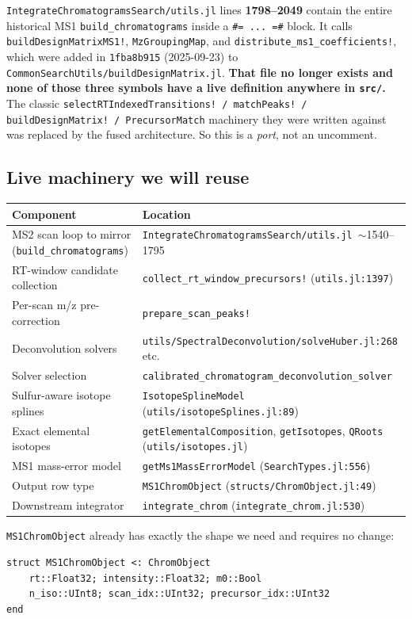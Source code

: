 \documentclass[11pt]{article}
\newcommand{\code}[1]{\texttt{\small #1}}
\newcommand{\file}[1]{\textcolor{blue!50!black}{\texttt{\small #1}}}
\begin{document}
\file{IntegrateChromatogramsSearch/utils.jl} lines \textbf{1798--2049} contain the entire
historical MS1 \code{build\_chromatograms} inside a \code{\#= ... =\#} block. It calls
\code{buildDesignMatrixMS1!}, \code{MzGroupingMap}, and \code{distribute\_ms1\_coefficients!},
which were added in \code{1fba8b915} (2025-09-23) to
\code{CommonSearchUtils/buildDesignMatrix.jl}. \textbf{That file no longer exists and none of
those three symbols have a live definition anywhere in \code{src/}.} The classic
\code{selectRTIndexedTransitions!\,/\,matchPeaks!\,/\,buildDesignMatrix!\,/\,PrecursorMatch}
machinery they were written against was replaced by the fused architecture. So this is a
\emph{port}, not an uncomment.

\subsection{Live machinery we will reuse}

\begin{tabular}{@{}ll@{}}
\toprule
\textbf{Component} & \textbf{Location} \\
\midrule
MS2 scan loop to mirror (\code{build\_chromatograms}) & \file{IntegrateChromatogramsSearch/utils.jl}~$\sim$1540--1795 \\
RT-window candidate collection & \code{collect\_rt\_window\_precursors!} (\file{utils.jl:1397}) \\
Per-scan m/z pre-correction & \code{prepare\_scan\_peaks!} \\
Deconvolution solvers & \file{utils/SpectralDeconvolution/solveHuber.jl:268} etc. \\
Solver selection & \code{calibrated\_chromatogram\_deconvolution\_solver} \\
Sulfur-aware isotope splines & \code{IsotopeSplineModel} (\file{utils/isotopeSplines.jl:89}) \\
Exact elemental isotopes & \code{getElementalComposition}, \code{getIsotopes}, \code{QRoots} (\file{utils/isotopes.jl}) \\
MS1 mass-error model & \code{getMs1MassErrorModel} (\file{SearchTypes.jl:556}) \\
Output row type & \code{MS1ChromObject} (\file{structs/ChromObject.jl:49}) \\
Downstream integrator & \code{integrate\_chrom} (\file{integrate\_chrom.jl:530}) \\
\bottomrule
\end{tabular}

\medskip
\noindent \code{MS1ChromObject} already has exactly the shape we need and requires no change:
\begin{lstlisting}
struct MS1ChromObject <: ChromObject
    rt::Float32; intensity::Float32; m0::Bool
    n_iso::UInt8; scan_idx::UInt32; precursor_idx::UInt32
end
\end{lstlisting}
\end{document}
